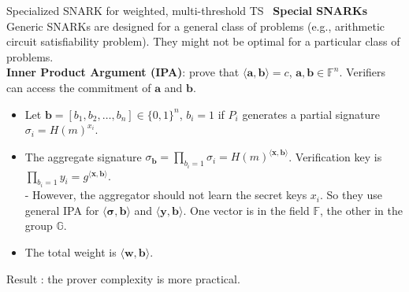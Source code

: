 \begin{frame}{Specialized SNARK for weighted, multi-threshold TS~\cite{DBLP:conf/ccs/DasCXNB023}}
    \textbf{Special SNARKs} Generic SNARKs are designed for a general class of problems (e.g., arithmetic circuit satisfiability problem). They might not be optimal for a particular class of problems. \\
    
    \textbf{Inner Product Argument (IPA)}: prove that $\langle \mathbf{a}, \mathbf{b}\rangle =c$, $\mathbf{a},\mathbf{b}\in \mathbb{F}^n$. Verifiers can access the commitment of $\mathbf{a}$ and $\mathbf{b}$. 
    \pause
    \begin{itemize}
        \item  Let $\mathbf{b} = [b_1, b_2,\dots, b_n]\in \{0,1\}^n$, $b_i=1$ if $P_i$ generates a partial signature $\sigma_i = H(m)^{x_i}$. 
        \item The aggregate signature $\sigma_{\mathbf{b}} = \prod_{b_i=1} \sigma_i = H(m)^{\langle\mathbf{x}, \mathbf{b}\rangle}$. Verification key is $\prod_{b_i=1}y_i = g^{\langle\mathbf{x}, \mathbf{b}\rangle}$. \\
            - However, the aggregator should not learn the secret keys $x_i$. So they use general IPA for $\langle\mathbf{\sigma}, \mathbf{b}\rangle$ and $\langle\mathbf{y}, \mathbf{b}\rangle$. One vector is in the field $\mathbb{F}$, the other in the group $\mathbb{G}$. 
        \item The total weight is $\langle\mathbf{w}, \mathbf{b}\rangle$. 
    \end{itemize}
    
    
    Result : the prover complexity is more practical. 
    \end{frame}